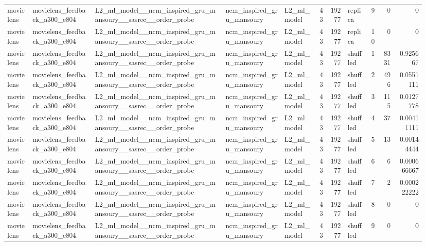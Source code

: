 \begin{table}[htbp!]
\begin{tabular}{lllllrrlrrr}
movielens & movielens\_feedback\_a300\_e804 & L2\_ml\_model\_\_ncm\_inspired\_gru\_mansoury\_\_sasrec\_\_order\_probe & ncm\_inspired\_gru\_mansoury & L2\_ml\_model & 43 & 19277 & replica & 9 & 0 & 0 \\
movielens & movielens\_feedback\_a300\_e804 & L2\_ml\_model\_\_ncm\_inspired\_gru\_mansoury\_\_sasrec\_\_order\_probe & ncm\_inspired\_gru\_mansoury & L2\_ml\_model & 43 & 19277 & replica & 10 & 0 & 0 \\
movielens & movielens\_feedback\_a300\_e804 & L2\_ml\_model\_\_ncm\_inspired\_gru\_mansoury\_\_sasrec\_\_order\_probe & ncm\_inspired\_gru\_mansoury & L2\_ml\_model & 43 & 19277 & shuffled & 1 & 8331 & 0.925667 \\
movielens & movielens\_feedback\_a300\_e804 & L2\_ml\_model\_\_ncm\_inspired\_gru\_mansoury\_\_sasrec\_\_order\_probe & ncm\_inspired\_gru\_mansoury & L2\_ml\_model & 43 & 19277 & shuffled & 2 & 496 & 0.0551111 \\
movielens & movielens\_feedback\_a300\_e804 & L2\_ml\_model\_\_ncm\_inspired\_gru\_mansoury\_\_sasrec\_\_order\_probe & ncm\_inspired\_gru\_mansoury & L2\_ml\_model & 43 & 19277 & shuffled & 3 & 115 & 0.0127778 \\
movielens & movielens\_feedback\_a300\_e804 & L2\_ml\_model\_\_ncm\_inspired\_gru\_mansoury\_\_sasrec\_\_order\_probe & ncm\_inspired\_gru\_mansoury & L2\_ml\_model & 43 & 19277 & shuffled & 4 & 37 & 0.00411111 \\
movielens & movielens\_feedback\_a300\_e804 & L2\_ml\_model\_\_ncm\_inspired\_gru\_mansoury\_\_sasrec\_\_order\_probe & ncm\_inspired\_gru\_mansoury & L2\_ml\_model & 43 & 19277 & shuffled & 5 & 13 & 0.00144444 \\
movielens & movielens\_feedback\_a300\_e804 & L2\_ml\_model\_\_ncm\_inspired\_gru\_mansoury\_\_sasrec\_\_order\_probe & ncm\_inspired\_gru\_mansoury & L2\_ml\_model & 43 & 19277 & shuffled & 6 & 6 & 0.000666667 \\
movielens & movielens\_feedback\_a300\_e804 & L2\_ml\_model\_\_ncm\_inspired\_gru\_mansoury\_\_sasrec\_\_order\_probe & ncm\_inspired\_gru\_mansoury & L2\_ml\_model & 43 & 19277 & shuffled & 7 & 2 & 0.000222222 \\
movielens & movielens\_feedback\_a300\_e804 & L2\_ml\_model\_\_ncm\_inspired\_gru\_mansoury\_\_sasrec\_\_order\_probe & ncm\_inspired\_gru\_mansoury & L2\_ml\_model & 43 & 19277 & shuffled & 8 & 0 & 0 \\
movielens & movielens\_feedback\_a300\_e804 & L2\_ml\_model\_\_ncm\_inspired\_gru\_mansoury\_\_sasrec\_\_order\_probe & ncm\_inspired\_gru\_mansoury & L2\_ml\_model & 43 & 19277 & shuffled & 9 & 0 & 0 \\

\end{tabular}
\end{table}
